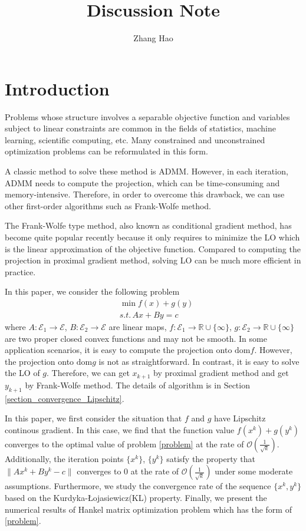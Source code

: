 \documentclass{article}
\title{Discussion Note}
\author{Zhang Hao}
\numberwithin{equation}{section}
\begin{document}
\maketitle


\section{Introduction }
Problems whose structure involves a separable objective function and variables subject to linear constraints are
common in the fields of statistics, machine learning, scientific computing, etc. Many constrained and unconstrained
optimization problems can be reformulated in this form. 

A classic method to solve these method is ADMM. However, in each iteration, ADMM needs to compute the projection, 
which can be time-consuming and memory-intensive. Therefore, in order to overcome this drawback, we can use other first-order
algorithms such as Frank-Wolfe method.

The Frank-Wolfe type method, also known as conditional gradient method, has become quite popular recently because it only requires to minimize the LO which is the linear approximation of the
objective function. Compared to computing the projection in proximal gradient method, solving LO can be much more
efficient in practice.

In this paper, we consider the following problem
\begin{align} \label{problem}
    &\min f(x)+g(y) \nonumber  \\
    &s.t.\hspace{2pt} Ax+By=c
\end{align}
where $A: \mathcal{E}_1 \rightarrow \mathcal{E}$, $B: \mathcal{E}_2 \rightarrow \mathcal{E}$ are linear maps, 
$f: \mathcal{E}_1 \rightarrow \mathbb{R}\cup\{\infty\}$, 
$g: \mathcal{E}_2 \rightarrow \mathbb{R}\cup\{\infty\}$ are two proper closed convex functions 
and may not be smooth. In some application scenarios, it is easy to compute the projection onto $\mathrm{dom} f$. However, the projection onto $\mathrm{dom} g$ is not as straightforward. In contrast, 
it is easy to solve the LO of $g$. Therefore, we can get $x_{k+1}$ by proximal gradient method and get $y_{k+1}$ by Frank-Wolfe
method.  The details of algorithm is in Section \ref{section_convergence_Lipschitz}.

In this paper, we first consider the situation that $f$ and $g$ have Lipschitz continous gradient. In this case, 
we find that the function value $f(x^k)+ g(y^k)$ converges to the optimal value of problem \eqref{problem}
at the rate of $\mathcal{O}\left( \frac{1}{\sqrt{k}} \right)$. Additionally, the iteration points $\{x^k\}$, $\{y^k\}$ 
satisfy the property that $\|Ax^k+By^k-c\rVert$  converges to 0 at the rate of $\mathcal{O}\left(\frac{1}{\sqrt{k}}\right)$ 
under some moderate assumptions. 
Furthermore, we study the convergence rate of the sequence $\{x^k,y^k\}$ based on the 
Kurdyka-\L{}ojasiewicz(KL) property. Finally, we present the numerical results of Hankel matrix optimization
problem which has the form of \eqref{problem}.  
\end{document}
